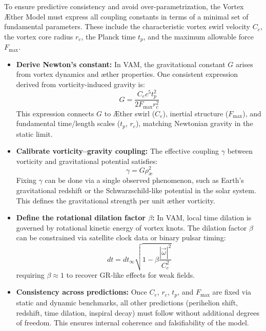 To ensure predictive consistency and avoid over-parametrization, the Vortex Æther Model must express all coupling constants in terms of a minimal set of fundamental parameters. These include the characteristic vortex swirl velocity $C_e$, the vortex core radius $r_c$, the Planck time $t_p$, and the maximum allowable force $F_{\max}$.

\begin{itemize}
    \item \textbf{Derive Newton's constant:} In VAM, the gravitational constant $G$ arises from vortex dynamics and æther properties. One consistent expression derived from vorticity-induced gravity is:
    \begin{equation}
        G = \frac{C_e c^5 t_p^2}{2 F_{\max} r_c^2}
    \end{equation}
    This expression connects $G$ to Æther swirl ($C_e$), inertial structure ($F_{\max}$), and fundamental time/length scales ($t_p$, $r_c$), matching Newtonian gravity in the static limit.

    \item \textbf{Calibrate vorticity–gravity coupling:} The effective coupling $\gamma$ between vorticity and gravitational potential satisfies:
    \begin{equation}
        \gamma = G \rho_\text{\ae}^2
    \end{equation}
    Fixing $\gamma$ can be done via a single observed phenomenon, such as Earth's gravitational redshift or the Schwarzschild-like potential in the solar system. This defines the gravitational strength per unit æther vorticity.

    \item \textbf{Define the rotational dilation factor $\beta$:} In VAM, local time dilation is governed by rotational kinetic energy of vortex knots. The dilation factor $\beta$ can be constrained via satellite clock data or binary pulsar timing:
    \[
    dt = dt_\infty \sqrt{1 - \beta \frac{|\vec{\omega}|^2}{C_e^2}}
    \]
    requiring $\beta \approx 1$ to recover GR-like effects for weak fields.

    \item \textbf{Consistency across predictions:} Once $C_e$, $r_c$, $t_p$, and $F_{\max}$ are fixed via static and dynamic benchmarks, all other predictions (perihelion shift, redshift, time dilation, inspiral decay) must follow without additional degrees of freedom. This ensures internal coherence and falsifiability of the model.
\end{itemize}


